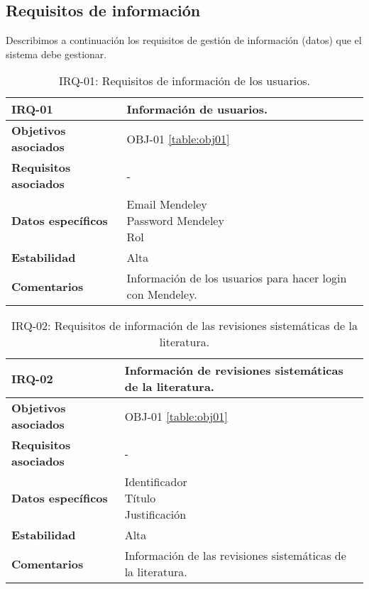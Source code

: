 \subsection{Requisitos de información}
Describimos a continuación los requisitos de gestión de información (datos) que el sistema debe gestionar.

\begin{table}[!hbt]
	\begin{center}
		\begin{tabular}{|p{5cm}|p{10cm}|}
			\hline
			\textbf{IRQ-01} & Información de usuarios.\\
			\hline
			\textbf{Objetivos asociados} & OBJ-01 \ref{table:obj01}\\
			\hline
			\textbf{Requisitos asociados} & -\\
			\hline
			\textbf{Datos específicos} & \shortstack[l]{Email Mendeley \\ Password Mendeley \\ Rol} \\
			\hline
			\textbf{Estabilidad} & Alta\\
			\hline
			\textbf{Comentarios} & Información de los usuarios para hacer login con Mendeley.\\
			\hline
		\end{tabular}
		\caption{IRQ-01: Requisitos de información de los usuarios.}
		\label{table:irq01}
	\end{center}
\end{table}

\begin{table}[!hbt]
	\begin{center}
		\begin{tabular}{|p{5cm}|p{10cm}|}
			\hline
			\textbf{IRQ-02} & Información de revisiones sistemáticas de la literatura.\\
			\hline
			\textbf{Objetivos asociados} & OBJ-01 \ref{table:obj01}\\
			\hline
			\textbf{Requisitos asociados} & -\\
			\hline
			\textbf{Datos específicos} & \shortstack[l]{Identificador \\ Título \\ Justificación} \\
			\hline
			\textbf{Estabilidad} & Alta\\
			\hline
			\textbf{Comentarios} & Información de las revisiones sistemáticas de la literatura.\\
			\hline
		\end{tabular}
		\caption{IRQ-02: Requisitos de información de las revisiones sistemáticas de la literatura.}
		\label{table:irq02}
	\end{center}
\end{table}

